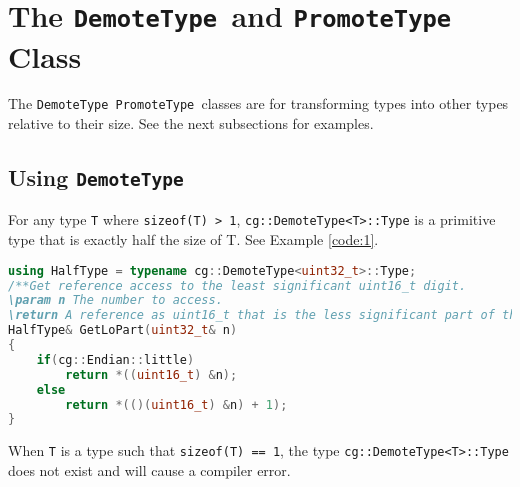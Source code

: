 \documentclass{article}
\newlength\tdima \newlength\tdimb \setlength\tdima{ \fboxsep+\fboxrule} \setlength\tdimb{-\fboxsep+\fboxrule}
\newcommand{\theobj}{\protect\Verb+DemoteType +}
\newcommand{\theobjt}{\protect\Verb+PromoteType +}
\begin{document}
\tableofcontents




\captionsetup[lstlisting]{format=listing,labelfont=white,textfont=white}
\lstset{style=cppstyle}

\section{The \theobj and \theobjt Class}

The \theobj \theobjt classes are for transforming types into other types relative to their size. See the next subsections for examples.

\subsection{Using \theobj}

For any type \Verb+T+ where \Verb+sizeof(T) > 1+,  \Verb+cg::DemoteType<T>::Type+ is a primitive type that is exactly half the size of T. See Example \vref{code:1}.

\begin{lstlisting}[language=C++, label=code:1, caption=Demoting types]
using HalfType = typename cg::DemoteType<uint32_t>::Type;
/**Get reference access to the least significant uint16_t digit.
\param n The number to access.
\return A reference as uint16_t that is the less significant part of the number.*/
HalfType& GetLoPart(uint32_t& n)
{
	if(cg::Endian::little)
		return *((uint16_t) &n);
	else
		return *(()(uint16_t) &n) + 1);
}
\end{lstlisting}

When \Verb+T+ is a type such that \Verb+sizeof(T) == 1+, the type \Verb+cg::DemoteType<T>::Type+ does not exist and will cause a compiler error.
\end{document}
